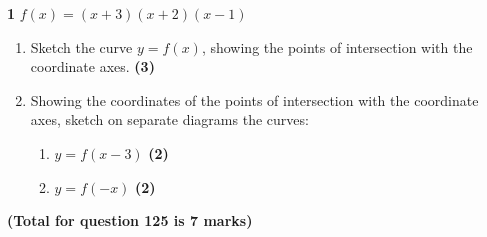 \documentclass[a4paper,12pt]{article}
\begin{document}
\begin{tcolorbox}
\textbf{1} \hspace{1em} %
\textbf{$f(x) = (x + 3)(x + 2)(x - 1)$} 

\begin{enumerate}[label=(\alph*)] 
\item Sketch the curve \( y = f(x) \), showing the points of intersection with the coordinate axes. \hfill \textbf{(3)} 
\vfill %

\item Showing the coordinates of the points of intersection with the coordinate axes, sketch on separate diagrams the curves:
    \begin{enumerate}[label=(\roman*)]
    \item \( y = f(x - 3) \) \hfill \textbf{(2)} 
    \vfill 
    \item \( y = f(-x) \) \hfill \textbf{(2)} 
    \vfill
    \end{enumerate}
\end{enumerate}

\hfill \textbf{(Total for question 125 is 7 marks)}

\end{tcolorbox} %
\end{document}
